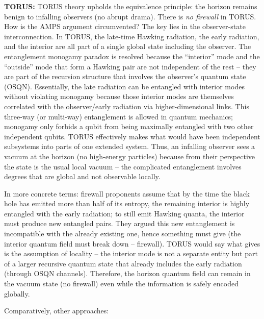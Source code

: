 \documentclass[]{article}
\begin{document}
\textbf{TORUS:} TORUS theory upholds the equivalence principle: the
horizon remains benign to infalling observers (no abrupt drama). There
is \emph{no firewall} in TORUS. How is the AMPS argument circumvented?
The key lies in the observer-state interconnection. In TORUS, the
late-time Hawking radiation, the early radiation, and the interior are
all part of a single global state including the observer. The
entanglement monogamy paradox is resolved because the ``interior'' mode
and the ``outside'' mode that form a Hawking pair are not independent of
the rest -- they are part of the recursion structure that involves the
observer's quantum state (OSQN). Essentially, the late radiation can be
entangled with interior modes without violating monogamy because those
interior modes are themselves correlated with the observer/early
radiation via higher-dimensional links. This three-way (or multi-way)
entanglement is allowed in quantum mechanics; monogamy only forbids a
qubit from being maximally entangled with two other independent qubits.
TORUS effectively makes what would have been independent subsystems into
parts of one extended system. Thus, an infalling observer sees a vacuum
at the horizon (no high-energy particles) because from their perspective
the state is the usual local vacuum -- the complicated entanglement
involves degrees that are global and not observable locally.

In more concrete terms: firewall proponents assume that by the time the
black hole has emitted more than half of its entropy, the remaining
interior is highly entangled with the early radiation; to still emit
Hawking quanta, the interior must produce new entangled pairs. They
argued this new entanglement is incompatible with the already existing
one, hence something must give (the interior quantum field must break
down -- firewall). TORUS would say what gives is the assumption of
locality -- the interior mode is not a separate entity but part of a
larger recursive quantum state that already includes the early radiation
(through OSQN channels). Therefore, the horizon quantum field can remain
in the vacuum state (no firewall) even while the information is safely
encoded globally.

Comparatively, other approaches:
\end{document}
